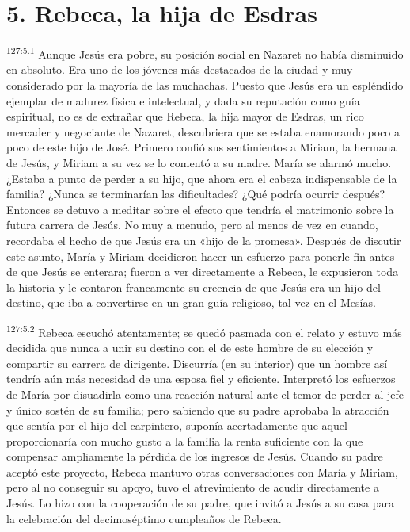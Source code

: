 \section*{5. Rebeca, la hija de Esdras}
\par 
\textsuperscript{127:5.1} Aunque Jesús era pobre, su posición social en Nazaret no había disminuido en absoluto. Era uno de los jóvenes más destacados de la ciudad y muy considerado por la mayoría de las muchachas. Puesto que Jesús era un espléndido ejemplar de madurez física e intelectual, y dada su reputación como guía espiritual, no es de extrañar que Rebeca, la hija mayor de Esdras, un rico mercader y negociante de Nazaret, descubriera que se estaba enamorando poco a poco de este hijo de José. Primero confió sus sentimientos a Miriam, la hermana de Jesús, y Miriam a su vez se lo comentó a su madre. María se alarmó mucho. ¿Estaba a punto de perder a su hijo, que ahora era el cabeza indispensable de la familia? ¿Nunca se terminarían las dificultades? ¿Qué podría ocurrir después? Entonces se detuvo a meditar sobre el efecto que tendría el matrimonio sobre la futura carrera de Jesús. No muy a menudo, pero al menos de vez en cuando, recordaba el hecho de que Jesús era un «hijo de la promesa». Después de discutir este asunto, María y Miriam decidieron hacer un esfuerzo para ponerle fin antes de que Jesús se enterara; fueron a ver directamente a Rebeca, le expusieron toda la historia y le contaron francamente su creencia de que Jesús era un hijo del destino, que iba a convertirse en un gran guía religioso, tal vez en el Mesías.

\par 
\textsuperscript{127:5.2} Rebeca escuchó atentamente; se quedó pasmada con el relato y estuvo más decidida que nunca a unir su destino con el de este hombre de su elección y compartir su carrera de dirigente. Discurría (en su interior) que un hombre así tendría aún más necesidad de una esposa fiel y eficiente. Interpretó los esfuerzos de María por disuadirla como una reacción natural ante el temor de perder al jefe y único sostén de su familia; pero sabiendo que su padre aprobaba la atracción que sentía por el hijo del carpintero, suponía acertadamente que aquel proporcionaría con mucho gusto a la familia la renta suficiente con la que compensar ampliamente la pérdida de los ingresos de Jesús. Cuando su padre aceptó este proyecto, Rebeca mantuvo otras conversaciones con María y Miriam, pero al no conseguir su apoyo, tuvo el atrevimiento de acudir directamente a Jesús. Lo hizo con la cooperación de su padre, que invitó a Jesús a su casa para la celebración del decimoséptimo cumpleaños de Rebeca.

